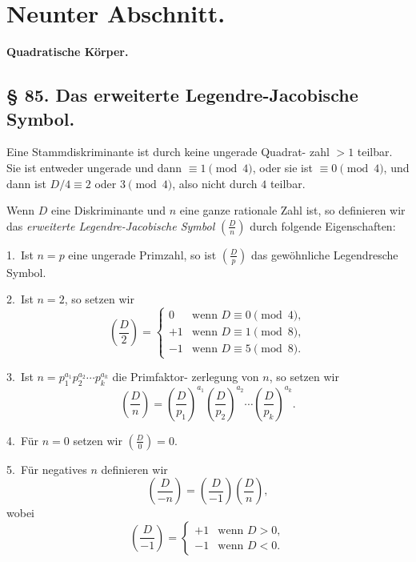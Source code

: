 \documentclass[12pt,a4paper]{article}
\theoremstyle{definition}
\begin{document}
\newpage
\section*{Neunter Abschnitt.}
\begin{center}
\textbf{Quadratische K\"orper.}
\end{center}

\subsection*{\S{} 85. Das erweiterte Legendre-Jacobische Symbol.}

Eine Stammdiskriminante ist durch keine ungerade Quadrat-
zahl $> 1$ teilbar. Sie ist entweder ungerade und dann $\equiv 1 \pmod{4}$,
oder sie ist $\equiv 0 \pmod{4}$, und dann ist $D/4 \equiv 2$ oder
$3 \pmod{4}$, also nicht durch $4$ teilbar.

Wenn $D$ eine Diskriminante und $n$ eine ganze rationale Zahl ist,
so definieren wir das \textit{erweiterte Legendre-Jacobische Symbol}
$\left(\frac{D}{n}\right)$ durch folgende Eigenschaften:

1.~Ist $n = p$ eine ungerade Primzahl, so ist $\left(\frac{D}{p}\right)$ das
gew\"ohnliche Legendresche Symbol.

2.~Ist $n = 2$, so setzen wir
\begin{equation}\tag{1}
\left(\frac{D}{2}\right) = \begin{cases}
0 & \text{wenn } D \equiv 0 \pmod{4}, \\
+1 & \text{wenn } D \equiv 1 \pmod{8}, \\
-1 & \text{wenn } D \equiv 5 \pmod{8}.
\end{cases}
\end{equation}

3.~Ist $n = p_1^{a_1} p_2^{a_2} \cdots p_k^{a_k}$ die Primfaktor-
zerlegung von $n$, so setzen wir
\begin{equation}\tag{2}
\left(\frac{D}{n}\right) = \left(\frac{D}{p_1}\right)^{a_1} \left(\frac{D}{p_2}\right)^{a_2} \cdots \left(\frac{D}{p_k}\right)^{a_k}.
\end{equation}

4.~F\"ur $n = 0$ setzen wir $\left(\frac{D}{0}\right) = 0$.

5.~F\"ur negatives $n$ definieren wir
\begin{equation}\tag{3}
\left(\frac{D}{-n}\right) = \left(\frac{D}{-1}\right) \left(\frac{D}{n}\right),
\end{equation}
wobei
\begin{equation}\tag{4}
\left(\frac{D}{-1}\right) = \begin{cases}
+1 & \text{wenn } D > 0, \\
-1 & \text{wenn } D < 0.
\end{cases}
\end{equation}
\end{document}
